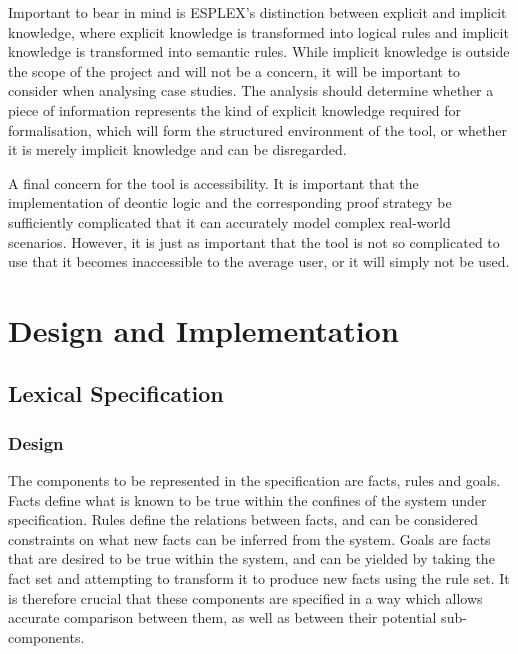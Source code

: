 \documentclass{l4proj}
\begin{document}
Important to bear in mind is ESPLEX's distinction between explicit and implicit knowledge, where explicit knowledge is transformed into logical rules and implicit knowledge is transformed into semantic rules. While implicit knowledge is outside the scope of the project and will not be a concern, it will be important to consider when analysing case studies. The analysis should determine whether a piece of information represents the kind of explicit knowledge required for formalisation, which will form the structured environment of the tool, or whether it is merely implicit knowledge and can be disregarded. 

A final concern for the tool is accessibility. It is important that the implementation of deontic logic and the corresponding proof strategy be sufficiently complicated that it can accurately model complex real-world scenarios. However, it is just as important that the tool is not so complicated to use that it becomes inaccessible to the average user, or it will simply not be used. 

\chapter{Design and Implementation}


\section{Lexical Specification}


\subsection{Design}
The components to be represented in the specification are facts, rules and goals. Facts define what is known to be true within the confines of the system under specification. Rules define the relations between facts, and can be considered constraints on what new facts can be inferred from the system. Goals are facts that are desired to be true within the system, and can be yielded by taking the fact set and attempting to transform it to produce new facts using the rule set. It is therefore crucial that these components are specified in a way which allows accurate comparison between them, as well as between their potential sub-components. 
\end{document}
